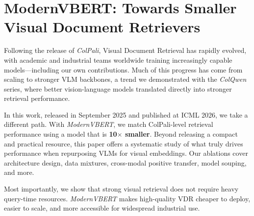 \setchapterpreamble[u]{\margintoc}
\chapter{ModernVBERT: Towards Smaller Visual Document Retrievers}
\label{ch:modernvbert}



\def\flagship{\emph{ModernVBERT}}
\def\flagshipbase{\flagship-base}
\def\flagshipembed{\flagship-embed}
\def\biflagship{\emph{BiModernVBERT}}
\def\colflagship{\emph{ColModernVBERT}}
\def\flagshipparameters{250M}

\newcommand{\cmark}{\ding{51}}%
\newcommand{\xmark}{\ding{55}}%

\def\natcap{\textit{NatCap}}
\def\repo{\url{https://huggingface.co/ModernVBERT}}
\def\ghrepo{\url{https://github.com/illuin-tech/modernvbert}}

\renewcommand\theadfont{\bfseries}


\begin{sagekaobox}[frametitle=Paper Context]
Following the release of \emph{ColPali}, Visual Document Retrieval has rapidly evolved, with academic and industrial teams worldwide training increasingly capable models---including our own contributions. Much of this progress has come from scaling to stronger VLM backbones, a trend we demonstrated with the \emph{ColQwen} series, where better vision-language models translated directly into stronger retrieval performance.

In this work, released in September 2025 and published at ICML 2026, we take a different path. With \emph{ModernVBERT}, we match ColPali-level retrieval performance using a model that is \textbf{10$\times$ smaller}. Beyond releasing a compact and practical resource, this paper offers a systematic study of what truly drives performance when repurposing VLMs for visual embeddings. Our ablations cover architecture design, data mixtures, cross-modal positive transfer, model souping, and more.

Most importantly, we show that strong visual retrieval does not require heavy query-time resources. \emph{ModernVBERT} makes high-quality VDR cheaper to deploy, easier to scale, and more accessible for widespread industrial use.
\end{sagekaobox}


